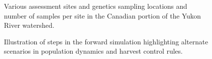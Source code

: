 \documentclass[11pt]{book}
\begin{document}
\begin{figure}[htb]

{\centering {} 

}

\caption{Various assessment sites and genetics sampling locations and number of samples per site in the Canadian portion of the Yukon River watershed.}\label{fig:fig-map-gsi}
\end{figure}

\begin{figure}[htb]

{\centering {} 

}

\caption{Illustration of steps in the forward simulation highlighting alternate scenarios in population dynamics and harvest control rules.}\label{fig:fig-schematic}
\end{figure}
\end{document}
